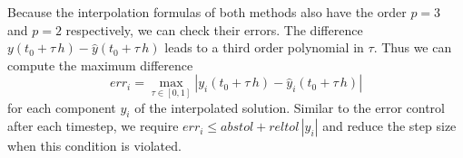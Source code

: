 \documentclass{juliacon}
\begin{document}
\begin{table}
 \label{tab:coeff}
\end{table}

Because the interpolation formulas of both methods also have the order $p=3$ and $p=2$ respectively, we can check their errors. 
The difference $y(t_0+ \tau \, h) - \hat y(t_0 + \tau \, h)$ leads to a third order polynomial in $\tau$. Thus we can compute the maximum difference 
\[err_i = \max_{\tau \in [0,1]}|y_i(t_0+ \tau \, h) - \hat y_i(t_0 + \tau \, h)|\]
 for each component $y_i$ of the interpolated solution. Similar to the error control after each timestep, we require 
 $err_i \leq abstol + reltol \,|y_i|$ and reduce the step size when this condition is violated.
 
\end{document}
